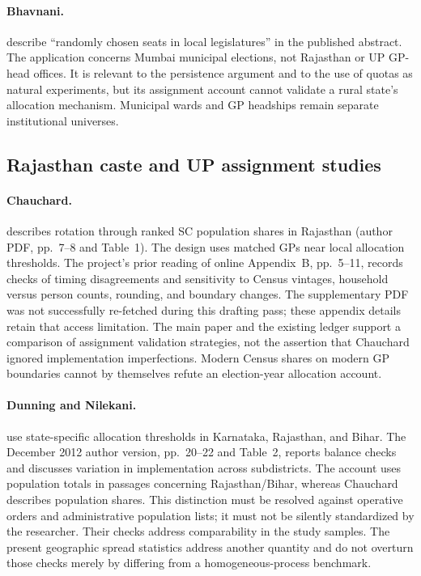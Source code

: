 \paragraph{Bhavnani.}
\citet{bhavnani2009} describe ``randomly chosen seats in local legislatures''
in the published abstract. The application concerns Mumbai municipal elections,
not Rajasthan or UP GP-head offices. It is relevant to the persistence argument
and to the use of quotas as natural experiments, but its assignment account
cannot validate a rural state's allocation mechanism. Municipal wards and GP
headships remain separate institutional universes.

\subsection{Rajasthan caste and UP assignment studies}

\paragraph{Chauchard.}
\citet{chauchard2014} describes rotation through ranked SC population shares
in Rajasthan (author PDF, pp.~7--8 and Table~1). The design uses
matched GPs near local allocation thresholds. The project's prior reading of
online Appendix~B, pp.~5--11, records checks of timing disagreements and
sensitivity to Census vintages, household versus person counts, rounding, and
boundary changes. The supplementary PDF was not successfully re-fetched during
this drafting pass; these appendix details retain that access limitation.
The main paper and the existing ledger support a comparison of assignment
validation strategies, not the assertion that Chauchard ignored implementation
imperfections. Modern Census shares on modern GP boundaries cannot by themselves
refute an election-year allocation account.

\paragraph{Dunning and Nilekani.}
\citet{dunning2013} use state-specific allocation thresholds in Karnataka,
Rajasthan, and Bihar. The December 2012 author version, pp.~20--22 and Table~2,
reports balance checks and discusses variation in implementation across
subdistricts. The account uses population totals in passages concerning
Rajasthan/Bihar, whereas Chauchard describes population shares. This distinction
must be resolved against operative orders and administrative population lists;
it must not be silently standardized by the researcher. Their checks address
comparability in the study samples. The present geographic spread statistics
address another quantity and do not overturn those checks merely by differing
from a homogeneous-process benchmark.

